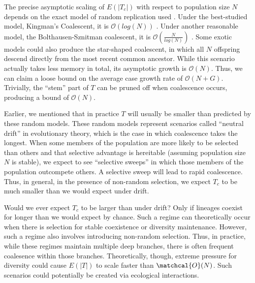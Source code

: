 The precise asymptotic scaling of $E(|T_c|)$ with respect to population size $N$ depends on the exact model of random replication used \citep{tellierCoalescenceMultipleBranching2014}.
Under the best-studied model, Kingman's Coalescent, it is $\mathcal{O}(log(N))$ \citep{kingmanCoalescent1982, delmasAsymptoticResultsLength2008}.
Under another reasonable model, the Bolthausen-Sznitman coalescent, it is $\mathcal{O}(\frac{N}{log(N)})$ \citep{drmotaAsymptoticResultsConcerning2007}.
Some exotic models could also produce the star-shaped coalescent, in which all $N$ offspring descend directly from the most recent common ancestor. 
While this scenario actually takes less memory in total, its asymptotic growth is $\mathcal{O}(N)$.
Thus, we can claim a loose bound on the average case growth rate of $\mathcal{O}(N + G)$.
Trivially, the ``stem'' part of $T$ can be pruned off when coalescence occurs, producing a bound of $\mathcal{O}(N)$.

Earlier, we mentioned that in practice $T$ will usually be smaller than predicted by these random models.
These random models represent scenarios called ``neutral drift'' in evolutionary theory, which is the case in which coalescence takes the longest.
When some members of the population are more likely to be selected than others and that selective advantage is hereitable (assuming population size $N$ is stable), we expect to see ``selective sweeps'' in which those members of the population outcompete others.
A selective sweep will lead to rapid coalescence.
Thus, in general, in the presence of non-random selection, we expect $T_c$ to be much smaller than we would expect under drift.

Would we ever expect $T_c$ to be larger than under drift?
Only if lineages coexist for longer than we would expect by chance.
Such a regime can theoretically occur when there is selection for stable coexistence or diversity maintenance.
However, such a regime also involves introducing non-random selection.
Thus, in practice, while these regimes maintain multiple deep branches, there is often frequent coalesence within those branches.
Theoretically, though, extreme pressure for diversity could cause $E(|T|)$ to scale faster than $\matchcal{O}(N)$.
Such scenarios could potentially be created via ecological interactions.

